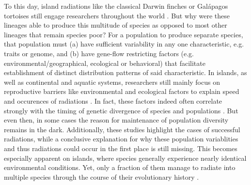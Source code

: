 \documentclass[a4paper]{scrartcl}
\begin{document}
To this day, island radiations like the classical Darwin finches or Galápagos tortoises %
still engage researchers throughout the world \cite{roman-palaciosTortoiseFinchTesting}.
But why were these lineages able to produce this multitude of species as opposed to most other lineages that remain species poor?
For a population to produce separate species, that population must
(a) have sufficient variability in any one characteristic, e.g. traits or genome, and
(b) have gene-flow restricting factors (e.g. environmental/geographical, ecological or behavioral) that facilitate establishment of distinct distribution patterns of said characteristic.
In islands, as well as continental and aquatic systems, researchers still mainly focus on reproductive barriers like environmental and ecological factors to explain speed and occurences of radiations \cite{krugSpeciesGenusRatios2008}\cite{hurlbertProcessesGeneratingLatitudinal2014}\cite{willisSpeciesDiversityScale2002}. %
In fact, these factors indeed often correlate strongly with the timing of genetic divergence of species and populations \cite{hembryEvolutionaryBiogeographyTerrestrial}. %
But even then, in some cases the reason for maintenance of population diversity remains in the dark. \cite{chenConcordanceGeneticDiversity}
Additionally, these studies highlight the cases of successful radiations, while a conclusive explanation for why these population variablities and thus radiations could occur in the first place is still missing.
This becomes especially apparent on islands, where species generally experience nearly identical environmental conditions.%
Yet, only a fraction of them manage to radiate into multiple species through the course of their evolutionary history \cite{hembryEvolutionaryBiogeographyTerrestrial}.
\end{document}
